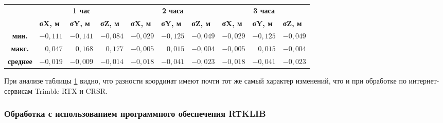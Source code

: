 \begin{table} [htbp]
	\centering\small
	\label{tab:tab12}{%
		\begin{tabular}{|c|rrr|rrr|rrr|}
			\hline
			\multirow{2}{*}{\textbf{ }} & 
			\multicolumn{3}{c|}{\textbf{1 час}}  & \multicolumn{3}{c|}{\textbf{2 часа}}  & \multicolumn{3}{c|}{\textbf{3 часа}}  \\ \cline{2-10} & 
			\multicolumn{1}{l|}{\textbf{σX, м}} & \multicolumn{1}{l|}{\textbf{σY, м}} & \multicolumn{1}{l|}{\textbf{σZ, м}} & \multicolumn{1}{l|}{\textbf{σX, м}} & \multicolumn{1}{l|}{\textbf{σY, м}} & \multicolumn{1}{l|}{\textbf{σZ, м}} & \multicolumn{1}{l|}{\textbf{σX, м}} & \multicolumn{1}{l|}{\textbf{σY, м}} & \multicolumn{1}{l|}{\textbf{σZ, м}} \\ \hline
			\textbf{мин.}         	            & 
			\multicolumn{1}{r|}{$-0,111$}       & \multicolumn{1}{r|}{$-0,141$}      & $-0,084$                            & \multicolumn{1}{r|}{$-0,029$}       & \multicolumn{1}{r|}{$-0,125$}      & $-0,049$                            & \multicolumn{1}{r|}{$-0,029$}       & \multicolumn{1}{r|}{$-0,125$}      & $-0,049$                            \\ \hline
			\textbf{макс.}                      & 
			\multicolumn{1}{r|}{$ 0,047$}       & \multicolumn{1}{r|}{$ 0,168$}      & $ 0,177$                            & \multicolumn{1}{r|}{$-0,005$}       & \multicolumn{1}{r|}{$ 0,015$}      & $-0,004$                            & \multicolumn{1}{r|}{$-0,005$}       & \multicolumn{1}{r|}{$ 0,015$}      & $-0,004$                            \\ \hline
			\textbf{среднее}                    & 
			\multicolumn{1}{r|}{$-0,019$}       & \multicolumn{1}{r|}{$-0,009$}      & $-0,014$                            & \multicolumn{1}{r|}{$-0,018$}       & \multicolumn{1}{r|}{$-0,041$}      & $-0,023$                            & \multicolumn{1}{r|}{$-0,018$}       & \multicolumn{1}{r|}{$-0,041$}      & $-0,023$                            \\ \hline
		\end{tabular}
	}
\end{table}
	
При анализе таблицы \cref{tab:tab12} видно, что разности координат имеют почти тот же самый характер изменений, что и при обработке по интернет-сервисам Trimble RTX и CRSR.



\subsubsection{Обработка с использованием программного обеспечения RTKLIB }\label{subsec:ch2/sec3/sub1/sub4}

